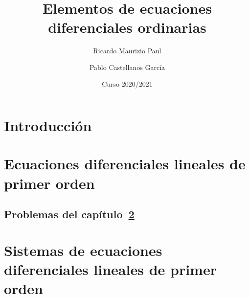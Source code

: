 \documentclass{report}
\title{Elementos de ecuaciones diferenciales ordinarias}
\author{Ricardo Maurizio Paul \and Pablo Castellanos García}
\date{Curso 2020/2021}
\begin{document}
\maketitle
\tableofcontents

\setcounter{chapter}{-1}
\chapter{Introducción}


\chapter{Ecuaciones diferenciales lineales de primer orden}
\label{chap:capitulo1}


\section{Problemas del capítulo~\ref{chap:capitulo1}}


\chapter{Sistemas de ecuaciones diferenciales lineales de primer orden}

\end{document}
